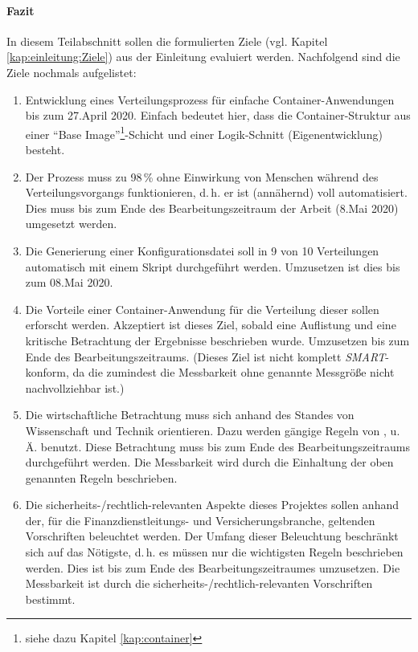 \paragraph{Fazit}
In diesem Teilabschnitt sollen die formulierten Ziele (vgl. Kapitel \vref{kap:einleitung:Ziele}) aus der Einleitung evaluiert werden. Nachfolgend sind die Ziele nochmals aufgelistet:

\begin{enumerate}
	\item Entwicklung eines Verteilungsprozess für einfache Container-Anwendungen bis zum 27.April 2020. Einfach bedeutet hier, dass die Container-Struktur aus einer \enquote{Base Image}\footnote{siehe dazu Kapitel \vref{kap:container}}-Schicht und einer Logik-Schnitt (Eigenentwicklung) besteht.
	\item Der Prozess muss zu 98\,\% ohne Einwirkung von Menschen während des Verteilungsvorgangs funktionieren, d.\,h. er ist (annähernd) voll automatisiert. Dies muss bis zum Ende des Bearbeitungszeitraum der Arbeit (8.Mai 2020) umgesetzt werden.
	\item Die Generierung einer Konfigurationsdatei soll in 9 von 10 Verteilungen automatisch mit einem Skript durchgeführt werden. Umzusetzen ist dies bis zum 08.Mai 2020.
	\item Die Vorteile einer Container-Anwendung für die Verteilung dieser sollen erforscht werden. Akzeptiert ist dieses Ziel, sobald eine Auflistung und eine kritische Betrachtung der Ergebnisse beschrieben wurde. Umzusetzen bis zum Ende des Bearbeitungszeitraums. (Dieses Ziel ist nicht komplett \textit{SMART}-konform, da die zumindest die Messbarkeit ohne genannte Messgröße nicht nachvollziehbar ist.)
	\item Die wirtschaftliche Betrachtung muss sich anhand des Standes von Wissenschaft und Technik orientieren. Dazu werden gängige Regeln von \cite{herman_is_2009}, \cite{brugger_it_2009} u.\,Ä. benutzt. Diese Betrachtung muss bis zum Ende des Bearbeitungszeitraums durchgeführt werden. Die Messbarkeit wird durch die Einhaltung der oben genannten Regeln beschrieben.
	\item Die sicherheits-/rechtlich-relevanten Aspekte dieses Projektes sollen anhand der, für die Finanzdienstleitungs- und Versicherungsbranche, geltenden Vorschriften beleuchtet werden. Der Umfang dieser Beleuchtung beschränkt sich auf das Nötigste, d.\,h. es müssen nur die wichtigsten Regeln beschrieben werden. Dies ist bis zum Ende des Bearbeitungszeitraumes umzusetzen. Die Messbarkeit ist durch die sicherheits-/rechtlich-relevanten Vorschriften bestimmt.
\end{enumerate}

